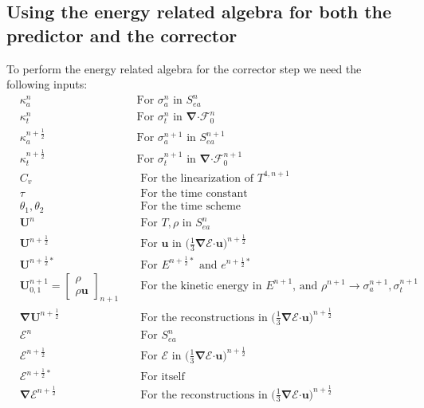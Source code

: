 \documentclass[10pt,letterpaper,notitlepage]{article}
\numberwithin{equation}{section}
\newcommand{\bnabla}{\boldsymbol{\nabla}}
\newcommand{\velocity}{\mathbf{u}}
\newcommand{\dotp}{\boldsymbol{\cdot}}
\newcommand{\RadE}{\mathcal{E}}
\newcommand{\RadF}{\boldsymbol{\mathcal{F}}}
\newcommand{\HydroU}{\mathbf{U}}
\newcommand{\HydroRhoRhoU}{\begin{bmatrix}
		\rho \\ \rho \velocity
\end{bmatrix}}
\newcommand{\RadJ}{\RadF_0}
\newcommand{\half}{\frac{1}{2}}
\newcommand{\beq}{\begin{equation*} \begin{aligned}}
\newcommand{\eeq}{\end{aligned}\end{equation*}}
\begin{document}
\subsection{Using the energy related algebra for both the predictor and the corrector}
To perform the energy related algebra for the corrector step we need the following inputs:
\beq
&\kappa_a^n &&\text{For }\sigma_a^n \text{ in }S_{ea}^n \\
&\kappa_t^n &&\text{For }\sigma_t^n \text{ in }\bnabla \dotp \RadJ^{n}\\
&\kappa_a^{n+\half} &&\text{For }\sigma_a^{n+1} \text{ in }S_{ea}^{n+1} \\
&\kappa_t^{n+\half} &&\text{For }\sigma_t^{n+1} \text{ in }\bnabla \dotp \RadJ^{n+1}\\
&C_v && \text{ For the linearization of } T^{4,n+1}\\
&\tau && \text{ For the time constant} \\
&\theta_1 ,\theta_2 &&\text{ For the time scheme} \\
&\HydroU^{n} && \text{ For } T, \rho \text{ in } S_{ea}^n \\
&\HydroU^{n+\half} && \text{ For } \velocity \text{ in }  \biggr( \frac{1}{3} \bnabla \RadE \dotp \velocity \biggr)^{n+\half}\\
&\HydroU^{n+\half*}  &&\text{ For } E^{n+\half*}\text{ and } e^{n+\half*}\\
&\HydroU_{0,1}^{n+1} = \HydroRhoRhoU_{n+1} &&\text{ For the kinetic energy in } E^{n+1}\text{, and }\rho^{n+1} \to \sigma_a^{n+1}, \sigma_t^{n+1} \\
&\bnabla \HydroU^{n+\half} && \text{ For the reconstructions in } \biggr( \frac{1}{3} \bnabla \RadE \dotp \velocity \biggr)^{n+\half}\\
&\RadE^{n} && \text{ For } S_{ea}^n \\
&\RadE^{n+\half} &&\text{ For } \RadE \text{ in }\biggr( \frac{1}{3} \bnabla \RadE \dotp \velocity \biggr)^{n+\half}\\
&\RadE^{n+\half*} &&\text{ For itself}\\
&\bnabla \RadE^{n+\half} &&\text{ For the reconstructions in } \biggr( \frac{1}{3} \bnabla \RadE \dotp \velocity \biggr)^{n+\half}\\
\eeq
\end{document}
